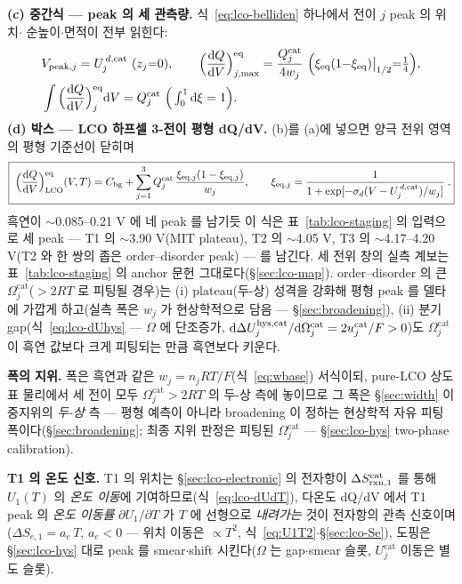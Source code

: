 \textbf{(c) 중간식 --- peak 의 세 관측량.} 식~\eqref{eq:lco-belliden} 하나에서 전이 $j$ peak 의 위치$\cdot$
순높이$\cdot$면적이 전부 읽힌다:
\begin{equation}
\begin{aligned}
&V_{\mathrm{peak},j}=U_j^{\,d,\mathrm{cat}}\ (z_j{=}0),\qquad
\Big(\frac{\dd Q}{\dd V}\Big)^{\eq}_{j,\max}=\frac{Q_j^\mathrm{cat}}{4w_j}\ \Big(\xi_\eq(1{-}\xi_\eq)\big|_{1/2}{=}\tfrac14\Big),\\
&\int\Big(\frac{\dd Q}{\dd V}\Big)^{\eq}_{j}\dd V=Q_j^\mathrm{cat}\ \Big(\textstyle\int_0^1\dd\xi=1\Big).
\end{aligned}
\label{eq:lco-peakobs}
\end{equation}
\textbf{(d) 박스 --- LCO 하프셀 3-전이 평형 dQ/dV.} (b)를 (a)에 넣으면 양극 전위 영역의 평형 기준선이 닫히며
\begin{equation}
\boxed{\;\Big(\frac{\mathrm{d} Q}{\mathrm{d} V}\Big)^{\mathrm{eq}}_\mathrm{LCO}(V,T)
=C_{\mathrm{bg}}+\sum_{j=1}^{3}Q_j^\mathrm{cat}\,
\frac{\xi_{\mathrm{eq},j}(1-\xi_{\mathrm{eq},j})}{w_j},
\qquad \xi_{\mathrm{eq},j}=\frac{1}{1+\exp[-\sigma_d(V-U_j^{\,d,\mathrm{cat}})/w_j]}\;.}
\label{eq:lco-eqpeak}
\end{equation}
흑연이 $\sim$0.085--0.21 V 에 네 peak 를 남기듯 이 식은 표~\ref{tab:lco-staging} 의 입력으로 세 peak ---
T1 의 $\sim$3.90 V(MIT plateau), T2 의 $\sim$4.05 V, T3 의 $\sim$4.17--4.20 V(T2 와 한 쌍의 좁은
order--disorder peak) --- 를 남긴다. 세 전위 창의 실측 계보는 표~\ref{tab:lco-staging} 의 anchor
문헌\cite{xia2007,reynier2004,motohashi2009} 그대로다(\S\ref{sec:lco-map}). order--disorder 의 큰 $\Omega_j^\mathrm{cat}$($>2RT$ 로 피팅될 경우)는
(i) plateau(두-상) 성격을 강화해 평형 peak 를 델타에 가깝게 하고(실측 폭은 $w_j$ 가 현상학적으로 담음 ---
\S\ref{sec:broadening}), (ii) 분기 gap(식~\eqref{eq:lco-dUhys} --- $\Omega$ 에 단조증가,
$\mathrm{d}\Delta U_j^{\mathrm{hys},\mathrm{cat}}/\mathrm{d}\Omega_j^\mathrm{cat}=2u_j^\mathrm{cat}/F>0$)도 $\Omega_j^\mathrm{cat}$ 이 흑연 값보다
크게 피팅되는 만큼 흑연보다 키운다.

\textbf{폭의 지위.} 폭은 흑연과 같은 $w_j=n_jRT/F$(식~\eqref{eq:wbase}) 서식이되, pure-LCO 상도표 물리에서 세
전이 모두 $\Omega_j^\mathrm{cat}>2RT$ 의 두-상 측에 놓이므로 그 폭은 \S\ref{sec:width} 이중지위의
\emph{두-상} 측 --- 평형 예측이 아니라 broadening 이 정하는 현상학적 자유 피팅 폭이다(\S\ref{sec:broadening};
최종 지위 판정은 피팅된 $\Omega_j^\mathrm{cat}$ --- \S\ref{sec:lco-hys} two-phase calibration).

\textbf{T1 의 온도 신호.} T1 의 위치는 \S\ref{sec:lco-electronic} 의 전자항이 $\Delta S_{\mathrm{rxn},1}^\mathrm{cat}$ 를 통해 $U_1(T)$ 의
\emph{온도 이동}에 기여하므로(식~\eqref{eq:lco-dUdT}), 다온도 dQ/dV 에서 T1 peak 의 \emph{온도 이동률}
$\partial U_1/\partial T$ 가 $T$ 에 선형으로 \emph{내려가는} 것이 전자항의 관측 신호이며($\Delta S_{e,1}=a_e\,T$, $a_e<0$ ---
위치 이동은 $\propto T^2$, 식~\eqref{eq:U1T2}$\cdot$\S\ref{sec:lco-Se}), 도핑은 \S\ref{sec:lco-hys} 대로 peak 를 smear$\cdot$shift 시킨다($\Omega$ 는
gap$\cdot$smear 슬롯, $U_j^\mathrm{cat}$ 이동은 별도 슬롯).

